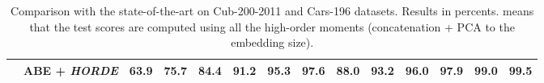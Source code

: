 \documentclass[10pt,twocolumn,letterpaper]{article}
\def\ourmethod{\textit{HORDE}}
\begin{document}
\begin{table*}[t!]
\begin{center}
\begin{tabular}{|c|c|cccccc|cccccc|}
                 & ABE + \ourmethod{} & \textbf{63.9} & \textbf{75.7} &\textbf{84.4} & \textbf{91.2} & \textbf{95.3} & \textbf{97.6} & \textbf{88.0} & \textbf{93.2 }& \textbf{96.0} & \textbf{97.9} &\textbf{ 99.0} & \textbf{99.5} \\
                \hline
            \end{tabular}
            \caption{Comparison with the state-of-the-art on Cub-200-2011 and Cars-196 datasets. Results in percents. {} means that the test scores are computed using all the high-order moments (concatenation + PCA to the embedding size).}
            \label{tab:CUB-CARS}
        \end{center}
        \vspace{-1em}
    \end{table*}
    
    \setlength{\tabcolsep}{7pt}
\end{document}
